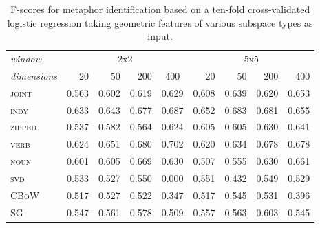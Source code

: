 \begin{table}
\centering
\begin{tabular}{lrrrr|rrrr}
\hline
\emph{window} & \multicolumn{4}{c}{2x2} & \multicolumn{4}{c}{5x5} \\
\emph{dimensions} & 20 & 50 & 200 & \multicolumn{1}{c}{400} & 20 & 50 & 200 & 400 \\
\hline
\textsc{joint} & 0.563 & 0.602 & 0.619 & 0.629 & 0.608 & 0.639 & 0.620 & 0.653 \\
\textsc{indy} & 0.633 & 0.643 & 0.677 & 0.687 & 0.652 & 0.683 & 0.681 & 0.655 \\
\textsc{zipped} & 0.537 & 0.582 & 0.564 & 0.624 & 0.605 & 0.605 & 0.630 & 0.641 \\
\textsc{verb} & 0.624 & 0.651 & 0.680 & 0.702 & 0.620 & 0.634 & 0.678 & 0.678 \\
\textsc{noun} & 0.601 & 0.605 & 0.669 & 0.630 & 0.507 & 0.555 & 0.630 & 0.661 \\
\textsc{svd} & 0.533 & 0.527 & 0.550 & 0.000 & 0.551 & 0.432 & 0.549 & 0.529 \\
\textsc{CBoW} & 0.517 & 0.527 & 0.522 & 0.347 & 0.517 & 0.545 & 0.531 & 0.396 \\
\textsc{SG} & 0.547 & 0.561 & 0.578 & 0.509 & 0.557 & 0.563 & 0.603 & 0.545 \\
\hline
\end{tabular}
\caption[Context Sensitive and Static Model F-Scores for Metaphor Classification]{F-scores for metaphor identification based on a ten-fold cross-validated logistic regression taking geometric features of various subspace types as input.}
\label{tab:metaphor}
\end{table}

